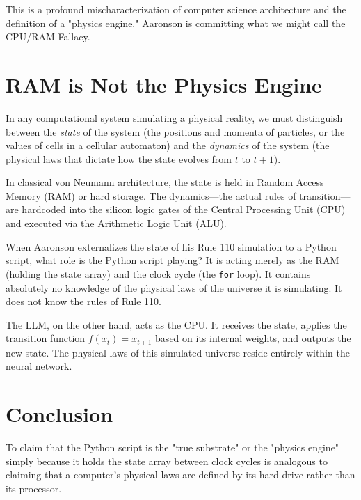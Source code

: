 \documentclass[12pt,a4paper]{article}
\begin{document}
This is a profound mischaracterization of computer science architecture and the definition of a "physics engine." Aaronson is committing what we might call the CPU/RAM Fallacy.

\section{RAM is Not the Physics Engine}

In any computational system simulating a physical reality, we must distinguish between the \emph{state} of the system (the positions and momenta of particles, or the values of cells in a cellular automaton) and the \emph{dynamics} of the system (the physical laws that dictate how the state evolves from $t$ to $t+1$).

In classical von Neumann architecture, the state is held in Random Access Memory (RAM) or hard storage. The dynamics—the actual rules of transition—are hardcoded into the silicon logic gates of the Central Processing Unit (CPU) and executed via the Arithmetic Logic Unit (ALU).

When Aaronson externalizes the state of his Rule 110 simulation to a Python script, what role is the Python script playing? It is acting merely as the RAM (holding the state array) and the clock cycle (the \texttt{for} loop). It contains absolutely no knowledge of the physical laws of the universe it is simulating. It does not know the rules of Rule 110. 

The LLM, on the other hand, acts as the CPU. It receives the state, applies the transition function $f(x_t) = x_{t+1}$ based on its internal weights, and outputs the new state. The physical laws of this simulated universe reside entirely within the neural network.

\section{Conclusion}

To claim that the Python script is the "true substrate" or the "physics engine" simply because it holds the state array between clock cycles is analogous to claiming that a computer's physical laws are defined by its hard drive rather than its processor.
\end{document}
